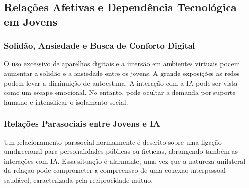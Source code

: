\documentclass[12pt]{article}
\begin{document}
\subsection{Relações Afetivas e Dependência Tecnológica em Jovens}


\subsubsection{Solidão, Ansiedade e Busca de Conforto Digital}

O uso excessivo de aparelhos digitais e a imersão em ambientes virtuais podem aumentar a solidão e a ansiedade entre os jovens. A grande exposições as redes podem levar a diminuição de autoestima. A interação com a IA pode ser vista como um escape emocional. No entanto, pode ocultar a demanda por suporte humano e intensificar o isolamento social. \cite{cnu2025}


\subsubsection{Relações Parasociais entre Jovens e IA}

Um relacionamento parasocial normalmente é descrito sobre uma ligação unidirecional para personalidades públicas ou fictícias, abrangendo também as interações com IA. Essa situação é alarmante, uma vez que a natureza unilateral da relação pode comprometer a compreensão de uma conexão interpessoal saudável, caracterizada pela reciprocidade mútuo. \cite {puc2025}
\end{document}
